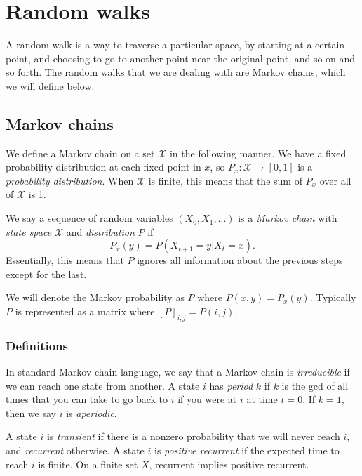\documentclass[]{article}
\theoremstyle{definition}
\numberwithin{theorem}{section}
\numberwithin{equation}{section}
\begin{document}
\section{Random walks}\label{sec:random walks}
A random walk is a way to traverse a particular space, by starting at a certain point, and choosing to go to another point near the original point, and so on and so forth. The random walks that we are dealing with are Markov chains, which we will define below. 

\subsection{Markov chains}

We define a Markov chain on a set $\mathcal{X}$ in the following manner. We have a fixed probability distribution at each fixed point in $x$, so $P_x : \mathcal{X} \rightarrow [0, 1]$ is a \textit{probability distribution}. When $\mathcal{X}$ is finite, this means that the sum of $P_x$ over all of $\mathcal{X}$ is 1. 

We say a sequence of random variables $(X_0, X_1, ...)$ is a \textit{Markov chain} with\textit{ state space} $\mathcal{X}$ and \textit{distribution} $P$ if 
\begin{equation}
	P_x(y) = P(X_{t + 1} = y | X_t = x).
\end{equation}
Essentially, this means that $P$ ignores all information about the previous steps except for the last. 

We will denote the Markov probability as $P$ where $P(x, y) = P_x(y)$. Typically $P$ is represented as a matrix where $[P]_{i,j} = P(i, j)$. 

\subsubsection{Definitions}
In standard Markov chain language, we say that a Markov chain is \textit{irreducible} if we can reach one state from another. A state $i$ has \textit{period} $k$ if $k$ is the gcd of all times that you can take to go back to $i$ if you were at $i$ at time $t = 0$. If $k = 1$, then we say $i$ is \textit{aperiodic}. 

A state $i$ is \textit{transient} if there is a nonzero probability that we will never reach $i$, and \textit{recurrent} otherwise. A state $i$ is \textit{positive recurrent} if the expected time to reach $i$ is finite. On a finite set $X$, recurrent implies positive recurrent. 
\end{document}
